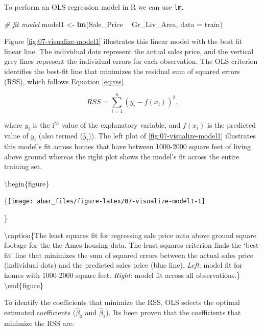 \documentclass[]{book}
\newenvironment{Shaded}{\begin{snugshade}}{\end{snugshade}}
\newcommand{\CommentTok}[1]{\textcolor[rgb]{0.56,0.35,0.01}{\textit{#1}}}
\newcommand{\DataTypeTok}[1]{\textcolor[rgb]{0.13,0.29,0.53}{#1}}
\newcommand{\KeywordTok}[1]{\textcolor[rgb]{0.13,0.29,0.53}{\textbf{#1}}}
\newcommand{\NormalTok}[1]{#1}
\newcommand{\OperatorTok}[1]{\textcolor[rgb]{0.81,0.36,0.00}{\textbf{#1}}}
\newcommand{\StringTok}[1]{\textcolor[rgb]{0.31,0.60,0.02}{#1}}
\theoremstyle{definition}
\theoremstyle{definition}
\theoremstyle{definition}
\theoremstyle{remark}
\begin{document}
To perform an OLS regression model in R we can use \texttt{lm}.

\begin{Shaded}
\begin{Highlighting}[]
\CommentTok{# fit model}
\NormalTok{model1 <-}\StringTok{ }\KeywordTok{lm}\NormalTok{(Sale_Price }\OperatorTok{~}\StringTok{ }\NormalTok{Gr_Liv_Area, }\DataTypeTok{data =}\NormalTok{ train)}
\end{Highlighting}
\end{Shaded}

Figure \ref{fig:07-visualize-model1} illustrates this linear model with
the best fit linear line. The individual dots represent the actual sales
price, and the vertical grey lines represent the individual errors for
each observation. The OLS criterion identifies the best-fit line that
minimizes the residual sum of squared errors (RSS), which follows
Equation \eqref{eq:rss}

\begin{equation}
\label{eq:rss}
  RSS = \sum^n_{i=1}(y_i - f(x_i))^2,
\end{equation}

where \(y_i\) is the i\(^{th}\) value of the explanatory variable, and
\(f(x_i)\) is the predicted value of \(y_i\) (also termed
(\(\hat y_i\))). The left plot of \ref{fig:07-visualize-model1}
illustrates this model's fit across homes that have between 1000-2000
square feet of living above ground whereas the right plot shows the
model's fit across the entire training set.

\textbackslash{}begin\{figure\}

\{\centering \texttt{[image: abar\_files/figure-latex/07-visualize-model1-1]}

\}

\textbackslash{}caption\{The least squares fit for regressing sale price
onto above ground square footage for the the Ames housing data. The
least squares criterion finds the `best-fit' line that minimizes the sum
of squared errors between the actual sales price (individual dots) and
the predicted sales price (blue line). \emph{Left}: model fit for homes
with 1000-2000 square feet. \emph{Right}: model fit across all
observations.\}\label{fig:07-visualize-model1} \textbackslash{}end\{figure\}

To identify the coefficients that minimize the RSS, OLS selects the
optimal estimated coefficients (\(\hat \beta_0\) and \(\hat \beta_1\)).
Its been proven that the coefficients that minimize the RSS are:
\end{document}
